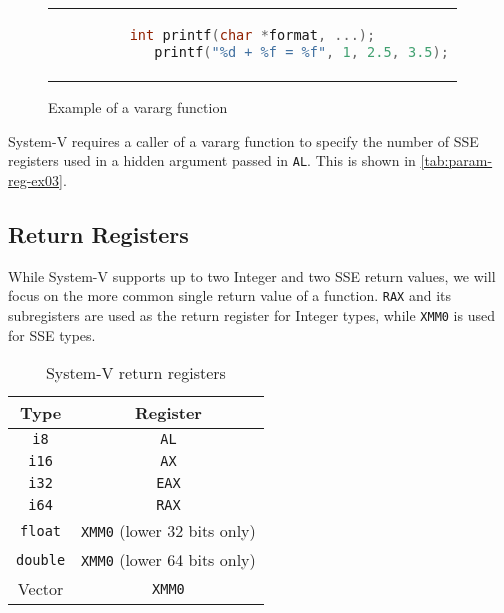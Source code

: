 \begin{figure}[htpb]
    \centering
    \begin{tabular}{c}
        \begin{lstlisting}[language=C]
            int printf(char *format, ...);
            printf("%d + %f = %f", 1, 2.5, 3.5);
        \end{lstlisting}
    \end{tabular}
    \caption{Example of a vararg function}
    \label{fig:printf}
\end{figure}

System-V requires a caller of a vararg function to specify the number of SSE registers used in a hidden argument passed in \texttt{AL}.
This is shown in \cref{tab:param-reg-ex03}.

\subsection{Return Registers}\label{subsec:return-registers}

While System-V supports up to two Integer and two SSE return values, we will focus on the more common single return value of a function.
\texttt{RAX} and its subregisters are used as the return register for Integer types, while \texttt{XMM0} is used for SSE types.

\begin{table}[htpb]
    \centering
    \begin{tabular}{|c|c|}
        \hline
        Type            & Register                           \\
        \hline
        \texttt{i8}     & \texttt{AL}                        \\
        \texttt{i16}    & \texttt{AX}                        \\
        \texttt{i32}    & \texttt{EAX}                       \\
        \texttt{i64}    & \texttt{RAX}                       \\
        \texttt{float}  & \texttt{XMM0} (lower 32 bits only) \\
        \texttt{double} & \texttt{XMM0} (lower 64 bits only) \\
        Vector          & \texttt{XMM0}                      \\
        \hline
    \end{tabular}
    \caption[System-V return registers]{System-V return registers}\label{tab:ret-regs}
\end{table}

